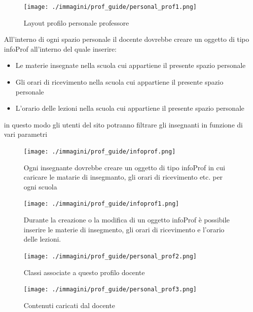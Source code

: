 \begin{figure}[H]
 \centering
 \texttt{[image: ./immagini/prof\_guide/personal\_prof1.png]}
 \caption{Layout profilo personale professore}
 \label{fig:personal_prof1}
\end{figure}
All'interno di ogni spazio personale il docente dovrebbe creare un oggetto di tipo infoProf all'interno del quale inserire:
\begin{itemize}
\item Le materie insegnate nella scuola cui appartiene il presente spazio personale
\item Gli orari di ricevimento nella scuola cui appartiene il presente spazio personale
\item L'orario delle lezioni nella scuola cui appartiene il presente spazio personale
\end{itemize}

in questo modo gli utenti del sito potranno filtrare gli insegnanti in funzione di vari parametri

\begin{figure}[H]
 \centering
 \texttt{[image: ./immagini/prof\_guide/infoprof.png]}
 \caption{Ogni insegnante dovrebbe creare un oggetto di tipo infoProf in cui caricare le matarie di insegmanto, gli orari di ricevimento etc. per ogni scuola}
 \label{fig:infoprof_crea}
\end{figure}
\begin{figure}[H]
 \centering
 \texttt{[image: ./immagini/prof\_guide/infoprof1.png]}
 \caption{Durante la creazione o la modifica di un oggetto infoProf è possibile inserire le materie di insegmento, gli orari di ricevimento e l'orario delle lezioni.}
 \label{fig:infoprof_edit1}
\end{figure}


\begin{figure}[H]
 \centering
 \texttt{[image: ./immagini/prof\_guide/personal\_prof2.png]}
 \caption{Classi associate a questo profilo docente}
 \label{fig:prof_personal22}
\end{figure}
\begin{figure}[H]
 \centering
 \texttt{[image: ./immagini/prof\_guide/personal\_prof3.png]}
 \caption{Contenuti caricati dal docente}
 \label{fig:prof_personal3}
\end{figure}

